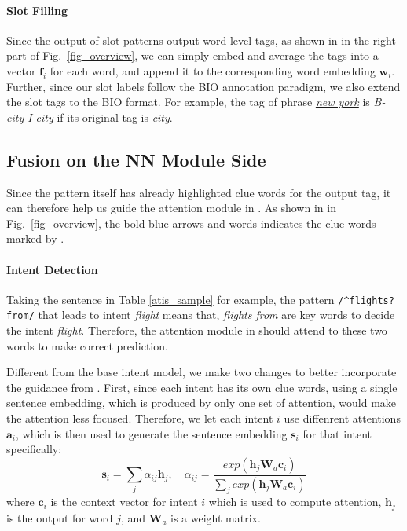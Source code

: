 \paragraph{Slot Filling}
Since the output of slot \RE patterns output word-level tags, as shown in  in the right part of Fig.~\ref{fig_overview}, we can simply embed and average the \RE tags into a vector $\textbf{f}_i$ for each word, and append it to the corresponding word embedding $\textbf{w}_i$. 
Further, since our slot labels follow the BIO annotation paradigm, we also extend the slot \RE tags to the BIO format. For example, the \RE tag of phrase \textsl{\underline{new york}} is \emph{B-city I-city} if its original tag is \emph{city}.

\subsection{Fusion on the NN Module Side}
\label{interact_with_module}
Since the \RE pattern itself has already highlighted clue words for the output tag, it can therefore help us guide the attention module in \NN.
As shown in  in Fig.~\ref{fig_overview}, the bold blue arrows and words indicates the clue words marked by \RE.
\paragraph{Intent Detection}
Taking the sentence in Table \ref{atis_sample} for example, the pattern \texttt{/\textasciicircum flights?\:from/} that leads to intent \emph{flight} means that, \textsl{\underline{flights from}} are key words to decide the intent \emph{flight}. Therefore, the attention module in \NN should attend to these two words to make correct prediction. 

Different from the base intent model, we make two changes to better incorporate the guidance from \RE.
First, since each intent has its own clue words, using a single sentence embedding, which is produced by only one set of attention, would make the attention less focused. 
Therefore, we let each intent $i$ use diffenrent attentions $\textbf{a}_i$, which is then used to generate the sentence embedding $\textbf{s}_i$ for that intent specifically:
\begin{equation}
\textbf{s}_i = \sum_{j}{\alpha_{ij}\textbf{h}_j}, \quad
\alpha_{ij}=\frac{exp(\textbf{h}_j\textbf{W}_a\textbf{c}_i)}{\sum_{j}{exp(\textbf{h}_j\textbf{W}_a\textbf{c}_i)}}
\label{label_att_eq}
\end{equation}
where $\textbf{c}_i$ is the context vector for intent $i$ which is used to compute attention, $\textbf{h}_j$ is the \BLSTM output for word $j$, and $\textbf{W}_a$ is a weight matrix.

